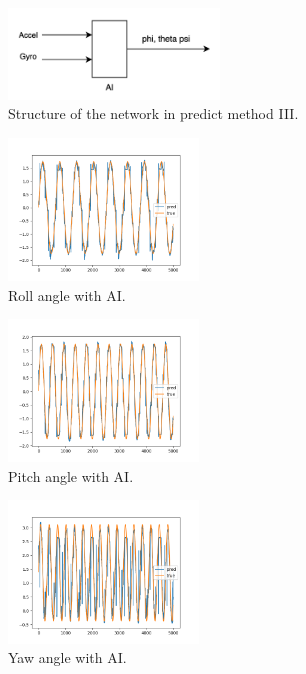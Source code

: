 \documentclass[conference]{IEEEtran}
\begin{document}
    \begin{figure}[H]
        \centerline{\includegraphics[width=0.5\textwidth]{../Figures/part_3_network_predict.png}}
        \caption{Structure of the network in predict method III.}
    \end{figure}

    \begin{figure}[H]
        \centerline{\includegraphics[width=0.45\textwidth]{../Figures/part_3_phi.png}}
        \caption{Roll angle with AI.}
    \end{figure}
    \begin{figure}[H]
        \centerline{\includegraphics[width=0.45\textwidth]{../Figures/part_3_theta.png}}
        \caption{Pitch angle with AI.}
    \end{figure}
    \begin{figure}[H]
        \centerline{\includegraphics[width=0.45\textwidth]{../Figures/part_3_psi.png}}
        \caption{Yaw angle with AI.}
    \end{figure}
\end{document}
